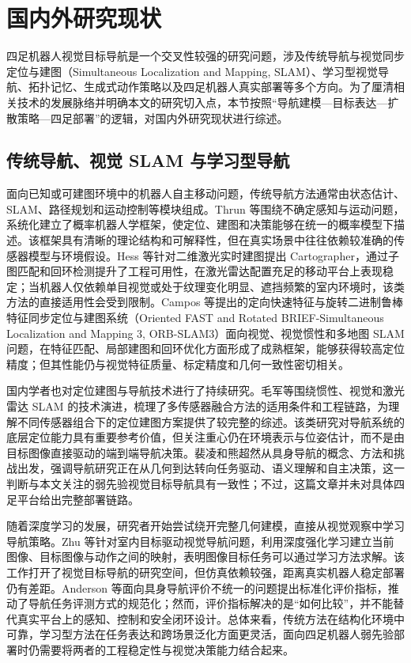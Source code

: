 \section{国内外研究现状}

四足机器人视觉目标导航是一个交叉性较强的研究问题，涉及传统导航与视觉同步定位与建图（Simultaneous Localization and Mapping, SLAM）、学习型视觉导航、拓扑记忆、生成式动作策略以及四足机器人真实部署等多个方向。为了厘清相关技术的发展脉络并明确本文的研究切入点，本节按照“导航建模—目标表达—扩散策略—四足部署”的逻辑，对国内外研究现状进行综述。

\subsection{传统导航、视觉 SLAM 与学习型导航}

面向已知或可建图环境中的机器人自主移动问题，传统导航方法通常由状态估计、SLAM、路径规划和运动控制等模块组成。Thrun 等\cite{thrun2005probabilistic}围绕不确定感知与运动问题，系统化建立了概率机器人学框架，使定位、建图和决策能够在统一的概率模型下描述。该框架具有清晰的理论结构和可解释性，但在真实场景中往往依赖较准确的传感器模型与环境假设。Hess 等\cite{cartographer2016}针对二维激光实时建图提出 Cartographer，通过子图匹配和回环检测提升了工程可用性，在激光雷达配置充足的移动平台上表现稳定；当机器人仅依赖单目视觉或处于纹理变化明显、遮挡频繁的室内环境时，该类方法的直接适用性会受到限制。Campos 等\cite{orbslam3_2021}提出的定向快速特征与旋转二进制鲁棒特征同步定位与建图系统（Oriented FAST and Rotated BRIEF-Simultaneous Localization and Mapping 3, ORB-SLAM3）面向视觉、视觉惯性和多地图 SLAM 问题，在特征匹配、局部建图和回环优化方面形成了成熟框架，能够获得较高定位精度；但其性能仍与视觉特征质量、标定精度和几何一致性密切相关。

国内学者也对定位建图与导航技术进行了持续研究。毛军等\cite{mao2022slam_review}围绕惯性、视觉和激光雷达 SLAM 的技术演进，梳理了多传感器融合方法的适用条件和工程链路，为理解不同传感器组合下的定位建图方案提供了较完整的综述。该类研究对导航系统的底层定位能力具有重要参考价值，但关注重心仍在环境表示与位姿估计，而不是由目标图像直接驱动的端到端导航决策。裴凌和熊超然\cite{pei2026embodied_nav}从具身导航的概念、方法和挑战出发，强调导航研究正在从几何到达转向任务驱动、语义理解和自主决策，这一判断与本文关注的弱先验视觉目标导航具有一致性；不过，这篇文章并未对具体四足平台给出完整部署链路。

随着深度学习的发展，研究者开始尝试绕开完整几何建模，直接从视觉观察中学习导航策略。Zhu 等\cite{zhu2017targetdriven}针对室内目标驱动视觉导航问题，利用深度强化学习建立当前图像、目标图像与动作之间的映射，表明图像目标任务可以通过学习方法求解。该工作打开了视觉目标导航的研究空间，但仿真依赖较强，距离真实机器人稳定部署仍有差距。Anderson 等\cite{anderson2018evaluation}面向具身导航评价不统一的问题提出标准化评价指标，推动了导航任务评测方式的规范化；然而，评价指标解决的是“如何比较”，并不能替代真实平台上的感知、控制和安全闭环设计。总体来看，传统方法在结构化环境中可靠，学习型方法在任务表达和跨场景泛化方面更灵活，面向四足机器人弱先验部署时仍需要将两者的工程稳定性与视觉决策能力结合起来。

